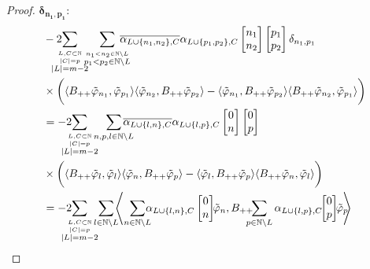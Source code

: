 \documentclass[b5paper,draft,openbib,12pt]{memoir}
\begin{document}
\begin{proof}
\(\boldsymbol{\delta_{n_1,p_1}:}\) 
\begin{align}
  &-2\hspace{-0.4cm}\sum_{\overset{L,C\subset \mathbb{N}}{\overset{|C|=p}{|L|=m-2}}}\hspace{-0.2cm}\sum_{\overset{n_1<n_2\in\mathbb{N}\backslash L }{p_1<p_2\in\mathbb{N}\backslash L }}
  \hspace{-0.4cm}\overline{\alpha_{L\cup\{n_1,n_2\},C}}\alpha_{L\cup\{p_1,p_2\},C}
\left[\begin{matrix}n_1\\n_2\end{matrix}\right]\left[\begin{matrix}p_1\\p_2\end{matrix}\right]\delta_{n_1,p_1}\\
    &\times \bigg(
    \langle B_{++}\tilde{\varphi}_{n_1},\tilde{\varphi}_{p_1} \rangle \langle  \tilde{\varphi}_{n_2}, B_{++}\tilde{\varphi}_{p_2}\rangle
    -\langle \tilde{\varphi}_{n_1},B_{++}\tilde{\varphi}_{p_2} \rangle \langle B_{++} \tilde{\varphi}_{n_2}, \tilde{\varphi}_{p_1}\rangle\bigg)\\
  &=-2\hspace{-0.4cm}\sum_{\overset{L,C\subset \mathbb{N}}{\overset{|C|=p}{|L|=m-2}}}\hspace{-0.2cm}\sum_{n,p,l \in\mathbb{N}\backslash L }
  \hspace{-0.4cm}\overline{\alpha_{L\cup\{l,n\},C}}\alpha_{L\cup\{l,p\},C}
\left[\begin{matrix}0\\n\end{matrix}\right]\left[\begin{matrix}0\\p\end{matrix}\right]\\
    &\times \bigg(
    \langle B_{++}\tilde{\varphi}_{l},\tilde{\varphi}_{l} \rangle \langle  \tilde{\varphi}_{n}, B_{++}\tilde{\varphi}_{p}\rangle
    -\langle \tilde{\varphi}_{l},B_{++}\tilde{\varphi}_{p} \rangle \langle B_{++} \tilde{\varphi}_{n}, \tilde{\varphi}_{l}\rangle\bigg)\\
    &=-2\hspace{-0.4cm}\sum_{\overset{L,C\subset \mathbb{N}}{\overset{|C|=p}{|L|=m-2}}}\hspace{-0.2cm}\sum_{l \in\mathbb{N}\backslash L }
\!\!\!\left\langle\sum_{n\in\mathbb{N}\backslash L}\!\!\!\!\alpha_{L\cup \{l,n\},C}\left[\begin{matrix}0\\n\end{matrix}\right] \!\!\tilde{\varphi}_{n} ,B_{++}\!\!\!\!\!\sum_{p\in\mathbb{N}\backslash L}\alpha_{L\cup \{l,p\},C}\!\!\left[\begin{matrix}0\\p\end{matrix}\right]\!\! \tilde{\varphi}_{p}  \!\!\!\right\rangle\\

\end{align}
\end{proof}
\end{document}
